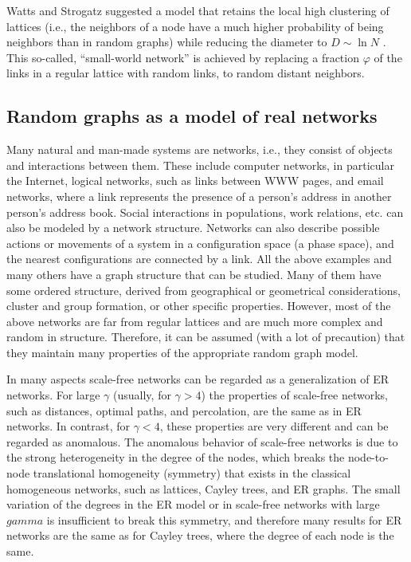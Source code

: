 \nd Watts and Strogatz suggested a model that retains the local high clustering of lattices (i.e., the neighbors of a node have a much higher probability of being neighbors than in random graphs) while reducing the diameter to $D \sim \ln N$ . This so-called, “small-world network” is achieved by replacing a fraction $\varphi$ of the links in a regular lattice with random links, to random distant neighbors. \s

\subsection{Random graphs as a model of real networks}

\nd Many natural and man-made systems are networks, i.e., they consist of objects and interactions between them. These include computer networks, in particular the Internet, logical networks, such as links between WWW pages, and email networks, where a link represents the presence of a person's address in another person's address book. Social interactions in populations, work relations, etc. can also be modeled by a network structure. Networks can also describe possible actions or movements of a system in a configuration space (a phase space), and the nearest configurations are connected by a link. All the above examples and many others have a graph structure that can be studied. Many of them have some ordered structure, derived from geographical or geometrical considerations, cluster and group formation, or other specific properties.  However, most of the above networks are far from regular lattices and are much more complex and random in structure. Therefore, it can be assumed (with a lot of precaution) that they maintain many properties of the appropriate random graph model. \s

\nd In many aspects scale-free networks can be regarded as a generalization of ER networks. For large $\gamma$ (usually, for $\gamma > 4$) the properties of scale-free networks, such as distances, optimal paths, and percolation, are the same as in ER networks. In contrast, for $\gamma < 4$, these properties are very different and can be regarded as anomalous. The anomalous behavior of scale-free networks is due to the strong heterogeneity in the degree of the nodes, which breaks the node-to-node translational homogeneity (symmetry) that exists in the classical
homogeneous networks, such as lattices, Cayley trees, and ER graphs. The small variation of the degrees in the ER model or in scale-free networks with large $gamma$ is insufficient to break this symmetry, and therefore many results for ER networks are the same as for Cayley trees, where the degree of each node is the same.
